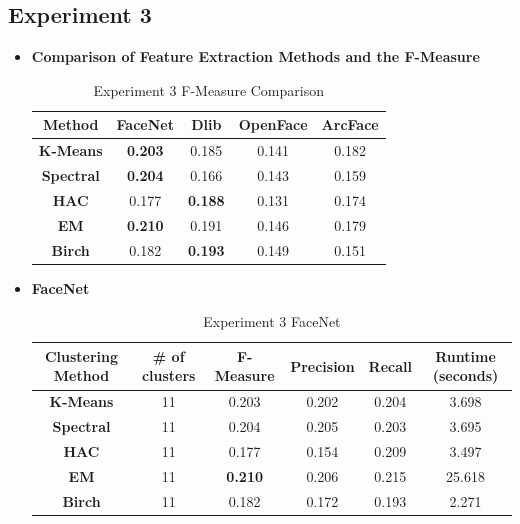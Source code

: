 \documentclass[12pt,english]{article}
\begin{document}
\subsection{Experiment 3}
\begin{itemize}
\item \textbf{Comparison of Feature Extraction Methods and the F-Measure}
\begin{table}[H]
\centering
\begin{tabular}{||c c c c c||} 
 \hline
Method & FaceNet & Dlib & OpenFace & ArcFace\\ [0.5ex]
 \hline\hline
 \textbf{K-Means} & \textbf{0.203} & 0.185 & 0.141 & 0.182\\ 
 \hline
  \textbf{Spectral} & \textbf{0.204} & 0.166 & 0.143 & 0.159\\
 \hline
 \textbf{HAC} & 0.177 & \textbf{0.188} & 0.131 & 0.174\\
 \hline
 \textbf{EM} & \textbf{0.210} & 0.191 & 0.146 & 0.179\\
 \hline
 \textbf{Birch} & 0.182 & \textbf{0.193} & 0.149 & 0.151\\
 \hline
\end{tabular}
\caption{Experiment 3 F-Measure Comparison}
\label{table:ex3}
\end{table}
\newpage
\item \textbf{FaceNet}
\begin{table}[H]
\centering
\begin{tabular}{||c c c c c c||} 
 \hline
 Clustering Method & \# of clusters & F-Measure & Precision & Recall & Runtime (seconds)\\ [0.5ex]
 \hline\hline
 \textbf{K-Means} & 11 & 0.203 & 0.202 & 0.204 & 3.698\\ 
 \hline
  \textbf{Spectral} & 11 & 0.204 & 0.205 & 0.203 & 3.695\\
 \hline
 \textbf{HAC} & 11 & 0.177 & 0.154 & 0.209 & 3.497\\
 \hline
 \textbf{EM} & 11 & \textbf{0.210} & 0.206 & 0.215 & 25.618\\
 \hline
 \textbf{Birch} & 11 & 0.182 & 0.172 & 0.193 & 2.271\\
 \hline
\end{tabular}
\caption{Experiment 3 FaceNet}
\label{table:ex3facenet}
\end{table}


\end{itemize}
\end{document}
